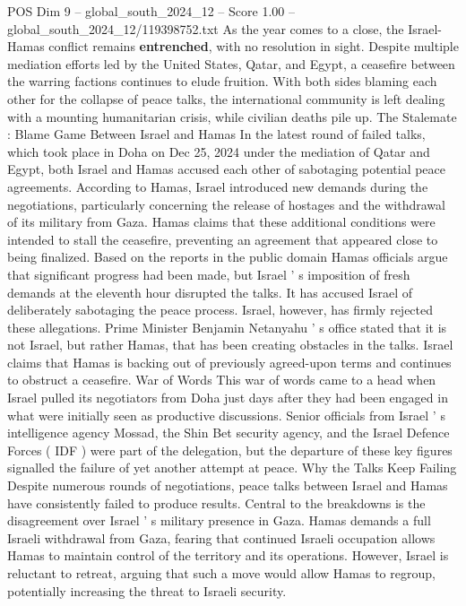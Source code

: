 \begin{textsample}{POS Dim 9 – global\_south\_2024\_12 – Score 1.00 – global\_south\_2024\_12/119398752.txt}  \label{ex:f9_pos_233}
As the year comes to a close, the Israel-Hamas conflict remains \textbf{entrenched}, with no resolution in sight.
Despite multiple mediation efforts led by the United States, Qatar, and Egypt, a ceasefire between the warring factions continues to elude fruition.
With both sides blaming each other for the collapse of peace talks, the international community is left dealing with a mounting humanitarian crisis, while civilian deaths pile up.
The Stalemate : Blame Game Between Israel and Hamas In the latest round of failed talks, which took place in Doha on Dec 25, 2024 under the mediation of Qatar and Egypt, both Israel and Hamas accused each other of sabotaging potential peace agreements.
According to Hamas, Israel introduced new demands during the negotiations, particularly concerning the release of hostages and the withdrawal of its military from Gaza.
Hamas claims that these additional conditions were intended to stall the ceasefire, preventing an agreement that appeared close to being finalized.
Based on the reports in the public domain Hamas officials argue that significant progress had been made, but Israel ' s imposition of fresh demands at the eleventh hour disrupted the talks.
It has accused Israel of deliberately sabotaging the peace process.
Israel, however, has firmly rejected these allegations.
Prime Minister Benjamin Netanyahu ' s office stated that it is not Israel, but rather Hamas, that has been creating obstacles in the talks.
Israel claims that Hamas is backing out of previously agreed-upon terms and continues to obstruct a ceasefire.
War of Words This war of words came to a head when Israel pulled its negotiators from Doha just days after they had been engaged in what were initially seen as productive discussions.
Senior officials from Israel ' s intelligence agency Mossad, the Shin Bet security agency, and the Israel Defence Forces ( IDF ) were part of the delegation, but the departure of these key figures signalled the failure of yet another attempt at peace.
Why the Talks Keep Failing Despite numerous rounds of negotiations, peace talks between Israel and Hamas have consistently failed to produce results.
Central to the breakdowns is the disagreement over Israel ' s military presence in Gaza.
Hamas demands a full Israeli withdrawal from Gaza, fearing that continued Israeli occupation allows Hamas to maintain control of the territory and its operations.
However, Israel is reluctant to retreat, arguing that such a move would allow Hamas to regroup, potentially increasing the threat to Israeli security.

\end{textsample}
